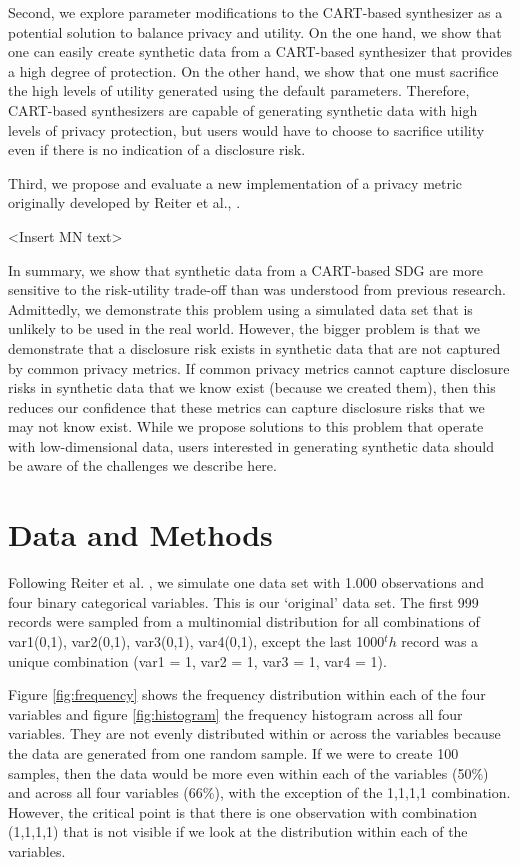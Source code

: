 \documentclass[runningheads]{llncs}
\begin{document}
Second, we explore parameter modifications to the CART-based synthesizer as a potential solution to balance privacy and utility.  On the one hand, we show that one can easily create synthetic data from a CART-based synthesizer that provides a high degree of protection.  On the other hand, we show that one must sacrifice the high levels of utility generated using the default parameters.  Therefore, CART-based synthesizers are capable of generating synthetic data with high levels of privacy protection, but users would have to choose to sacrifice utility even if there is no indication of a disclosure risk.

Third, we propose and evaluate a new implementation of a privacy metric originally developed by Reiter et al., \cite{reiter2014bayesian}. 

<Insert MN text>

In summary, we show that synthetic data from a CART-based SDG are more sensitive to the risk-utility trade-off than was understood from previous research.  Admittedly, we demonstrate this problem using a simulated data set that is unlikely to be used in the real world.  However, the bigger problem is that we demonstrate that a disclosure risk exists in synthetic data that are not captured by common privacy metrics.  If common privacy metrics cannot capture disclosure risks in synthetic data that we know exist (because we created them), then this reduces our confidence that these metrics can capture disclosure risks that we may not know exist.  While we propose solutions to this problem that operate with low-dimensional data, users interested in generating synthetic data should be aware of the challenges we describe here.

\section{Data and Methods}

Following Reiter et al. \cite{reiter2014bayesian}, we simulate one data set with 1.000 observations and four binary categorical variables.  This is our `original' data set.  The first 999 records were sampled from a multinomial distribution for all combinations of var1(0,1), var2(0,1), var3(0,1), var4(0,1), except the last 1000$^th$ record was a unique combination (var1 = 1, var2 = 1, var3 = 1, var4 = 1).  

Figure \ref{fig:frequency} shows the frequency distribution within each of the four variables and figure \ref{fig:histogram} the frequency histogram across all four variables.  They are not evenly distributed within or across the variables because the data are generated from one random sample.  If we were to create 100 samples, then the data would be more even within each of the variables (50\%) and across all four variables (66\%), with the exception of the 1,1,1,1 combination.  However, the critical point is that there is one observation with combination (1,1,1,1) that is not visible if we look at the distribution within each of the variables.
\end{document}
